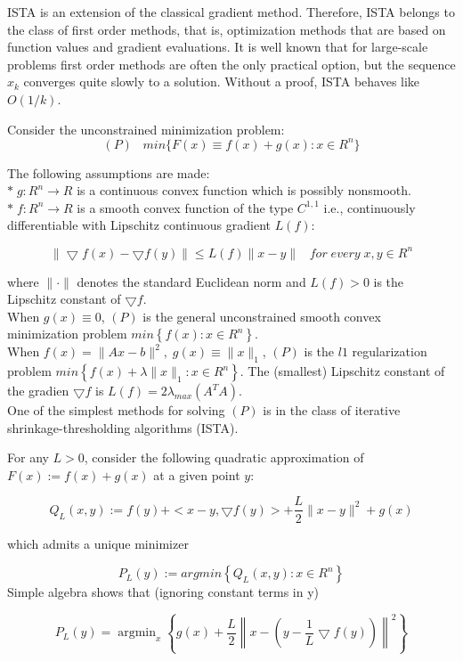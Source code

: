 \documentclass[12pt]{article}
\DeclareMathOperator*{\argmin}{argmin} %
\begin{document}
ISTA is an extension of the classical gradient method. Therefore, ISTA belongs to the class of first order methods, that is, optimization methods that are based on function values and gradient evaluations.
It is well known that for large-scale problems first order methods are often the only practical option, but the sequence ${x_k}$ converges quite slowly to a solution. Without a proof, ISTA behaves like $O(1/k)$.

Consider the unconstrained minimization problem:
$$(P)\;\;\; min\{F(x)\equiv f(x) + g(x) : x \in R^n \} $$

The following assumptions are made:\\
$ *\; g: R^n \rightarrow R$ is a continuous convex function which is possibly nonsmooth.\\
$ *\; f: R^n \rightarrow R$ is a smooth convex function of the type $C^{1,1}$ i.e., continuously differentiable with Lipschitz continuous gradient $L(f)$:

$$\| \bigtriangledown f(x) - \bigtriangledown f(y) \| \leq L(f) \|x-y\| \;\;\;for \;every\; x,y \in R^n $$

where $\| \cdot \|$ denotes the standard Euclidean norm and $L(f) > 0$ is the Lipschitz constant
of $\bigtriangledown f$.\\

When $g(x) \equiv0$, $(P)$ is the general unconstrained smooth convex minimization problem $min\left\{f(x): x\in R^n \right\}$.\\

When $f(x) = \|Ax-b\|^2,\;g(x) \equiv \| x \|_1 $, $(P)$ is the $l1$ regularization problem $min\left\{f(x) + \lambda \|x\|_1 : x\in R^n \right\}$. The (smallest) Lipschitz constant of the gradien $ \bigtriangledown f$ is $L(f) =2\lambda _{max}(A^T A)$.\\

One of the simplest methods for solving $(P)$ is in the class of iterative shrinkage-thresholding algorithms (ISTA).

For any $L > 0$, consider the following quadratic approximation of $F(x) := f(x) + g(x)$ at a given point $y$:

$$Q_L (x,y) := f(y) + <x-y, \bigtriangledown f(y)> + \frac{L}{2} \|x-y\|^2 +g(x)$$

which admits a unique minimizer

$$P_L(y) := argmin \left\{Q_L(x,y) :x \in R^n\right\}$$
Simple algebra shows that (ignoring constant terms in y)

$$P_L (y) =\argmin_x \left\{g(x) + \frac{L}{2} \left\| x-\left(y-\dfrac{1}{L}\bigtriangledown f(y)\right)\right\|^2\right\}$$
\end{document}

